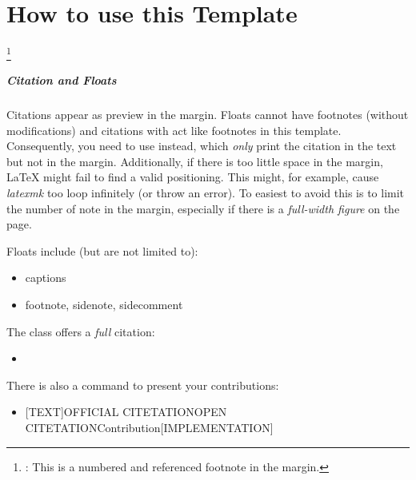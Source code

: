 


\cleardoublepage
\chapter{How to use this Template}


\lipsum[1-1]%
\footnote{\detokenize{\footnote}: This is a numbered and referenced footnote in the margin.} 
\lipsum[2-2]%


\paragraph{Citation and Floats}

Citations \cite{cryptoeprint:2021/1484} appear as preview in the margin. 
Floats cannot have footnotes (without modifications) and citations with \detokenize{\cite} act like footnotes in this template. 
Consequently, 
you need to use \detokenize{\citeonly} instead, 
which \emph{only} print the citation in the text but not in the margin. 
Additionally, 
if there is too little space in the margin, 
LaTeX might fail to find a valid positioning. 
This might, for example, cause \emph{latexmk} too loop infinitely (or throw an error). 
To easiest to avoid this is to limit the number of note in the margin, especially if there is a \emph{full-width figure} on the page.


Floats include (but are not limited to):
\begin{itemize}
	\item captions
	\item footnote, sidenote, sidecomment
\end{itemize}

The class offers a \emph{full} citation:
\begin{itemize}
 	\item \detokenize{\fullfullcite}
 \end{itemize} 


There is also a command to present your contributions:

\begin{itemize}
	\item \detokenize{\contentsource}[TEXT]{OFFICIAL CITETATION}{OPEN CITETATION}{Contribution}[IMPLEMENTATION]
\end{itemize}

